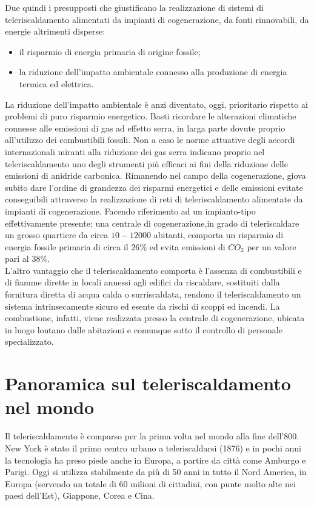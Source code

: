 \documentclass[laurea,oneside,11pt]{USiena_tesiLM}
\begin{document}
Due quindi i presupposti che giustificano la realizzazione di sistemi di teleriscaldamento alimentati da impianti di cogenerazione, da fonti rinnovabili, da energie altrimenti disperse:
\begin{itemize}
\item il risparmio di energia primaria di origine fossile;
\item la riduzione dell'impatto ambientale connesso alla produzione di energia termica ed elettrica.
\end{itemize}
La riduzione dell'impatto ambientale è anzi diventato, oggi, prioritario rispetto ai problemi di puro risparmio energetico. Basti ricordare le alterazioni climatiche connesse alle emissioni di gas ad effetto serra, in larga parte dovute proprio all'utilizzo dei combustibili fossili. Non a caso le norme attuative degli accordi internazionali miranti alla riduzione dei gas serra indicano proprio nel teleriscaldamento uno degli strumenti più efficaci ai fini della riduzione delle emissioni di anidride carbonica.
Rimanendo nel campo della cogenerazione, giova subito dare l'ordine di grandezza dei risparmi energetici e delle emissioni evitate conseguibili attraverso la realizzazione di reti di teleriscaldamento alimentate da impianti di cogenerazione.
Facendo riferimento ad un impianto-tipo effettivamente presente: una centrale di cogenerazione,in grado di teleriscaldare un grosso quartiere da circa $10-12000$ abitanti, comporta un risparmio di energia fossile primaria di circa il $26\%$ ed evita emissioni di $CO_2$ per un valore pari al $38\%$.\\

L'altro vantaggio che il teleriscaldamento comporta è l'assenza di combustibili e di fiamme dirette in locali annessi agli edifici da riscaldare, sostituiti dalla fornitura diretta di acqua calda o surriscaldata, rendono il teleriscaldamento un sistema intrinsecamente sicuro ed esente da rischi di scoppi ed incendi.
La combustione, infatti, viene realizzata presso la centrale di cogenerazione, ubicata in luogo lontano dalle abitazioni e comunque sotto il controllo di personale specializzato.

\section{Panoramica sul teleriscaldamento nel mondo}
Il teleriscaldamento è comparso per la prima volta nel mondo alla fine dell'800. New York è stato il primo centro urbano a teleriscaldarsi (1876) e in pochi anni la tecnologia ha preso piede anche in Europa, a partire da città come Amburgo e Parigi.
Oggi si utilizza stabilmente da più di 50 anni in tutto il Nord America, in Europa (servendo un totale di 60 milioni di cittadini, con punte molto alte nei paesi dell'Est), Giappone, Corea e Cina.\\
\end{document}
